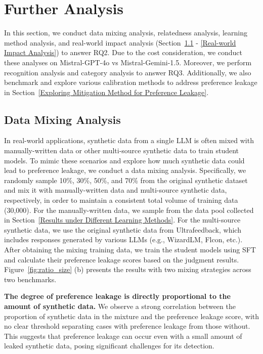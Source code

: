 \documentclass{article} %
\begin{document}
\section{Further Analysis}
\label{Further Analysis}

In this section, we conduct data mixing analysis, relatedness analysis, learning method analysis, and real-world impact analysis (Section~\ref{Data Mixing Analysis} - \ref{Real-world Impact Analysis}) to answer RQ2. Due to the cost consideration, we conduct these analyses on Mistral-GPT-4o vs Mistral-Gemini-1.5. Moreover, we perform recognition analysis and category analysis to answer RQ3. Additionally, we also benchmark and explore various calibration methods to address preference leakage in Section~\ref{Exploring Mitigation Method for Preference Leakage}.


\subsection{Data Mixing Analysis}
\label{Data Mixing Analysis}

In real-world applications, synthetic data from a single LLM is often mixed with manually-written data or other multi-source synthetic data to train student models. To mimic these scenarios and explore how much synthetic data could lead to preference leakage, we conduct a data mixing analysis. Specifically, we randomly sample 10\%, 30\%, 50\%, and 70\% from the original synthetic dataset and mix it with manually-written data and multi-source synthetic data, respectively, in order to maintain a consistent total volume of training data (30,000). For the manually-written data, we sample from the data pool collected in Section~\ref{Results under Different Learning Methods}. For the multi-source synthetic data, we use the original synthetic data from Ultrafeedback, which includes responses generated by various LLMs (e.g., WizardLM, Flcon, etc.). After obtaining the mixing training data, we train the student models using SFT and calculate their preference leakage scores based on the judgment results. Figure~\ref{fig:ratio_size} (b) presents the results with two mixing strategies across two benchmarks.

\textbf{The degree of preference leakage is directly proportional to the amount of synthetic data.} We observe a strong correlation between the proportion of synthetic data in the mixture and the preference leakage score, with no clear threshold separating cases with preference leakage from those without. This suggests that preference leakage can occur even with a small amount of leaked synthetic data, posing significant challenges for its detection.
\end{document}
